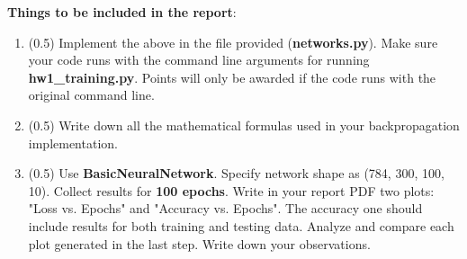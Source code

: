 \documentclass{article}
\newcommand{\homeworknumber}{1}
\begin{document}
\noindent \textbf{Things to be included in the report}:
\begin{enumerate}
  \item (0.5) Implement the above in the file provided (\textbf{networks.py}). Make sure your code runs with the command line arguments for running \textbf{hw\homeworknumber\_training.py}. Points will only be awarded if the code runs with the original command line.
  \item (0.5) Write down all the mathematical formulas used in your backpropagation implementation.
  \item (0.5) Use \textbf{BasicNeuralNetwork}. Specify network shape as (784, 300, 100, 10). Collect results for \textbf{100 epochs}.
        Write in your report PDF two plots: "Loss vs. Epochs" and "Accuracy vs. Epochs". The
        accuracy one should include results for both training and
        testing data. Analyze and compare each plot generated in the last step. Write down your observations.
        

\end{enumerate}
\end{document}
